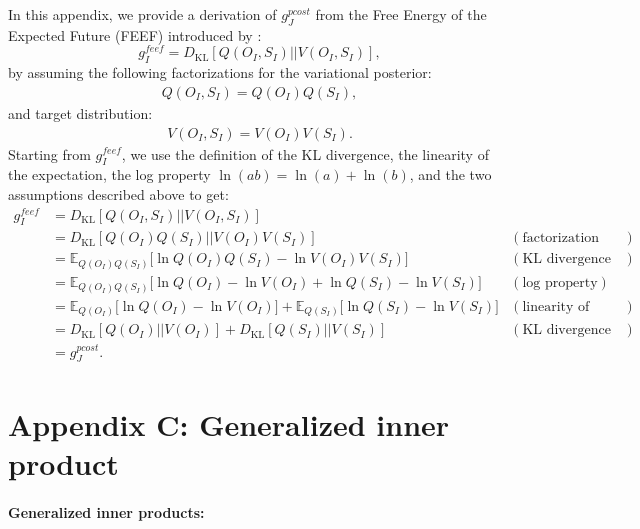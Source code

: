 \documentclass[twoside,11pt]{article}
\newcommand{\kl}[2]{D_{\mathrm{KL}} \left[ \left. \left. #1 \right|\right| #2 \right] }
\begin{document}
In this appendix, we provide a derivation of $g^{pcost}_J$ from the Free Energy of the Expected Future (FEEF) introduced by \citet{millidge2020expected}:
\begin{equation*}
g^{feef}_I = \kl{Q(O_I, S_I)}{V(O_I, S_I)},
\end{equation*}
by assuming the following factorizations for the variational posterior:
\begin{align*}
Q(O_I,S_I) = Q(O_I)Q(S_I),
\end{align*}
and target distribution:
\begin{align*}
V(O_I,S_I) = V(O_I)V(S_I).
\end{align*}
Starting from $g^{feef}_I$, we use the definition of the KL divergence, the linearity of the expectation, the log property $\ln(ab) = \ln(a) + \ln(b)$, and the two assumptions described above to get:
\begin{align*}
g^{feef}_I &= \kl{Q(O_I, S_I)}{V(O_I, S_I)} &\\
&= \kl{Q(O_I)Q(S_I)}{V(O_I)V(S_I)} &(\text{factorization assumptions})\\
&= \mathbb{E}_{Q(O_I)Q(S_I)}\big[\ln Q(O_I)Q(S_I) - \ln V(O_I)V(S_I)\big] &(\text{KL divergence definition})\\
&= \mathbb{E}_{Q(O_I)Q(S_I)}\big[\ln Q(O_I) - \ln V(O_I) + \ln Q(S_I) - \ln V(S_I)\big] &(\text{log property})\\
&= \mathbb{E}_{Q(O_I)}\big[\ln Q(O_I) - \ln V(O_I)\big] + \mathbb{E}_{Q(S_I)}\big[\ln Q(S_I) - \ln V(S_I)\big] &(\text{linearity of expectation})\\
&= \kl{Q(O_I)}{V(O_I)} + \kl{Q(S_I)}{V(S_I)} &(\text{KL divergence definition})\\
&= g^{pcost}_J.&
\end{align*}

\section*{Appendix C: Generalized inner product}

\paragraph{Generalized inner products:}
\end{document}
